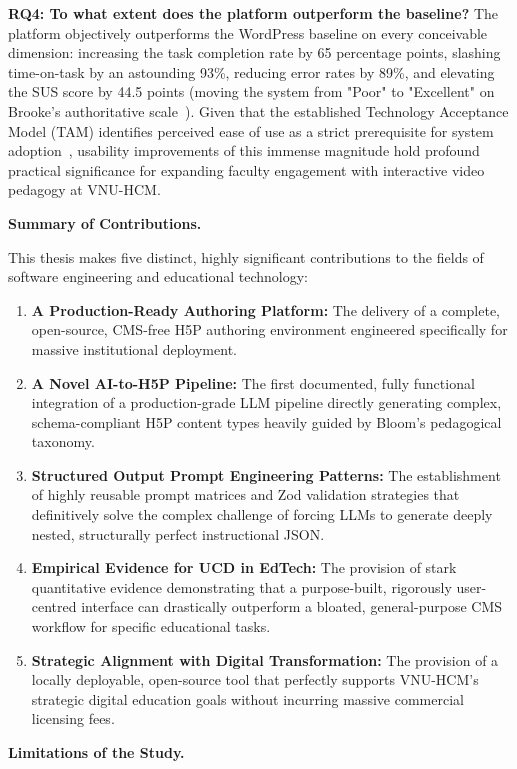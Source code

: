 \textbf{RQ4: To what extent does the platform outperform the baseline?}
The platform objectively outperforms the WordPress baseline on every conceivable dimension: increasing the task completion rate by 65 percentage points, slashing time-on-task by an astounding 93\%, reducing error rates by 89\%, and elevating the SUS score by 44.5 points (moving the system from "Poor" to "Excellent" on Brooke's authoritative scale~\cite{brooke1996}). Given that the established Technology Acceptance Model (TAM) identifies perceived ease of use as a strict prerequisite for system adoption~\cite{davis1989}, usability improvements of this immense magnitude hold profound practical significance for expanding faculty engagement with interactive video pedagogy at VNU-HCM.

\textbf{Summary of Contributions.}

This thesis makes five distinct, highly significant contributions to the fields of software engineering and educational technology:
\begin{enumerate}
  \item \textbf{A Production-Ready Authoring Platform:} The delivery of a complete, open-source, CMS-free H5P authoring environment engineered specifically for massive institutional deployment.
  \item \textbf{A Novel AI-to-H5P Pipeline:} The first documented, fully functional integration of a production-grade LLM pipeline directly generating complex, schema-compliant H5P content types heavily guided by Bloom's pedagogical taxonomy.
  \item \textbf{Structured Output Prompt Engineering Patterns:} The establishment of highly reusable prompt matrices and Zod validation strategies that definitively solve the complex challenge of forcing LLMs to generate deeply nested, structurally perfect instructional JSON.
  \item \textbf{Empirical Evidence for UCD in EdTech:} The provision of stark quantitative evidence demonstrating that a purpose-built, rigorously user-centred interface can drastically outperform a bloated, general-purpose CMS workflow for specific educational tasks.
  \item \textbf{Strategic Alignment with Digital Transformation:} The provision of a locally deployable, open-source tool that perfectly supports VNU-HCM's strategic digital education goals without incurring massive commercial licensing fees.
\end{enumerate}

\textbf{Limitations of the Study.}

